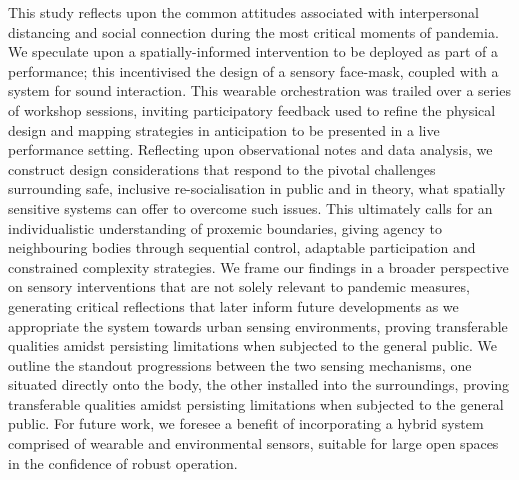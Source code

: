 This study reflects upon the common attitudes associated with interpersonal distancing and social connection during the most critical moments of pandemia. We speculate upon a spatially-informed intervention to be deployed as part of a performance; this incentivised the design of a sensory face-mask, coupled with a system for sound interaction. This wearable orchestration was trailed over a series of workshop sessions, inviting participatory feedback used to refine the physical design and mapping strategies in anticipation to be presented in a live performance setting. Reflecting upon observational notes and data analysis, we construct design considerations that respond to the pivotal challenges surrounding safe, inclusive re-socialisation in public and in theory, what spatially sensitive systems can offer to overcome such issues. This ultimately calls for an individualistic understanding of proxemic boundaries, giving agency to neighbouring bodies through sequential control, adaptable participation and constrained complexity strategies. We frame our findings in a broader perspective on sensory interventions that are not solely relevant to pandemic measures, generating critical reflections that later inform future developments as we appropriate the system towards urban sensing environments, proving transferable qualities amidst persisting limitations when subjected to the general public. We outline the standout progressions between the two sensing mechanisms, one situated directly onto the body, the other installed into the surroundings, proving transferable qualities amidst persisting limitations when subjected to the general public. For future work, we foresee a benefit of incorporating a hybrid system comprised of wearable and environmental sensors, suitable for large open spaces in the confidence of robust operation.



